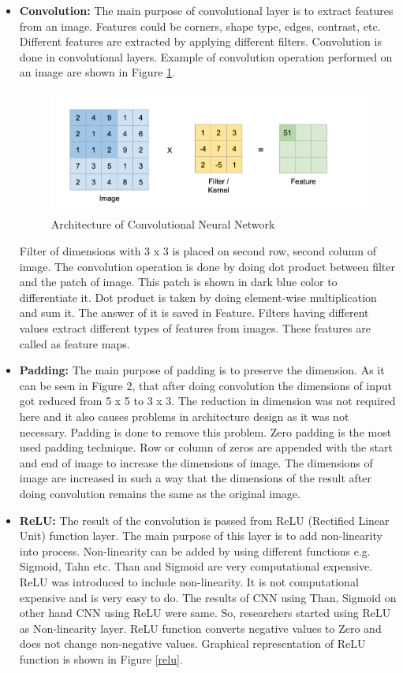 \begin{itemize}
  \item \textbf{Convolution: } The main purpose of convolutional layer is to extract features from an image. Features could be corners, shape type, edges, contrast, etc. Different features are extracted by applying different filters. Convolution is done in convolutional layers. Example of convolution operation performed on an image are shown in Figure \ref{convolution}. 
  \begin{figure}[H]
    \centering
    \includegraphics[scale=0.25]{images/Chapter2/convolution.png}
    \caption{Architecture of Convolutional Neural Network \cite{conv}}
    \label{convolution}
  \end{figure}
  Filter of dimensions with 3 x 3 is placed on second row, second column of image. The convolution operation is done by doing dot product between filter and the patch of image. This patch is shown in dark blue color to differentiate it. Dot product is taken by doing element-wise multiplication and sum it. The answer of it is saved in Feature. Filters having different values extract different types of features from images. These features are called as feature maps.
  \item \textbf{Padding: } The main purpose of padding is to preserve the dimension. As it can be seen in Figure 2, that after doing convolution the dimensions of input got reduced from 5 x 5 to 3 x 3. The reduction in dimension was not required here and it also causes problems in architecture design as it was not necessary. Padding is done to remove this problem. Zero padding is the most used padding technique. Row or column of zeros are appended with the start and end of image to increase the dimensions of image. The dimensions of image are increased in such a way that the dimensions of the result after doing convolution remains the same as the original image.
  \item \textbf{ReLU: } The result of the convolution is passed from ReLU (Rectified Linear Unit) function layer. The main purpose of this layer is to add non-linearity into process. Non-linearity can be added by using different functions e.g. Sigmoid, Tahn etc. Than and Sigmoid are very computational expensive. ReLU was introduced to include non-linearity. It is not computational expensive and is very easy to do. The results of CNN using Than, Sigmoid on other hand CNN using ReLU were same. So, researchers started using ReLU as Non-linearity layer. ReLU function converts negative values to Zero and does not change non-negative values. Graphical representation of ReLU function is shown in Figure \ref{relu}.

\end{itemize}
